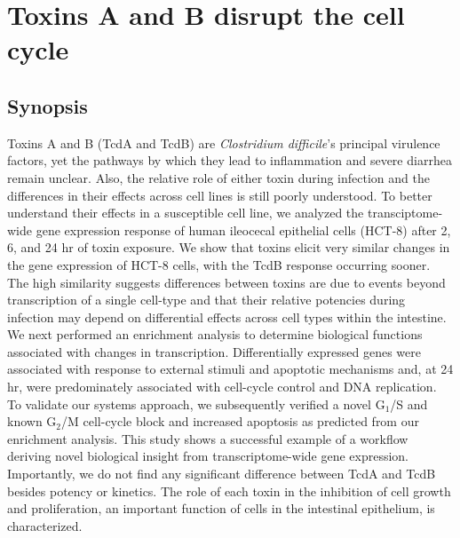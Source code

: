 
\chapter{ Toxins A and B disrupt the cell cycle }

\section{Synopsis}
Toxins A and B (TcdA and TcdB) are \textit{Clostridium difficile}'s 
principal virulence factors, yet the pathways by which they lead 
to inflammation and severe diarrhea remain unclear. Also, the 
relative role of either toxin during infection and the differences 
in their effects across cell lines is still poorly understood. 
To better understand their effects in a susceptible cell line, 
we analyzed the transciptome-wide gene expression response of human 
ileocecal epithelial cells (HCT-8) after 2, 6, and 24 hr of toxin exposure. 
We show that toxins elicit very similar changes in the gene 
expression of HCT-8 cells, with the TcdB response occurring sooner. 
The high similarity suggests differences between toxins are due 
to events beyond transcription of a single cell-type and that 
their relative potencies during infection may depend on differential 
effects across cell types within the intestine. We next performed an 
enrichment analysis to determine biological functions associated with 
changes in transcription. Differentially expressed genes were 
associated with response to external stimuli and apoptotic 
mechanisms and, at 24 hr, were predominately associated with 
cell-cycle control and DNA replication. To validate our systems 
approach, we subsequently verified a novel G$_{\text{1}}$/S and 
known G$_{\text{2}}$/M cell-cycle block and increased apoptosis 
as predicted from our enrichment analysis. 
This study shows a successful example of a workflow 
deriving novel biological insight from transcriptome-wide 
gene expression. Importantly, we do not find any significant 
difference between TcdA and TcdB besides potency or kinetics. 
The role of each toxin in the inhibition of cell growth and 
proliferation, an important function of cells in the 
intestinal epithelium, is characterized.


